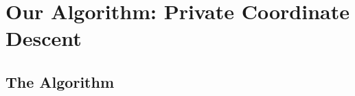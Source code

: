 \documentclass{beamer}
\newcommand{\norm}[1]{\left \lVert #1 \right \rVert}
\begin{document}
\section{Our Algorithm: Private Coordinate Descent}





\subsection{The Algorithm}
\end{document}
